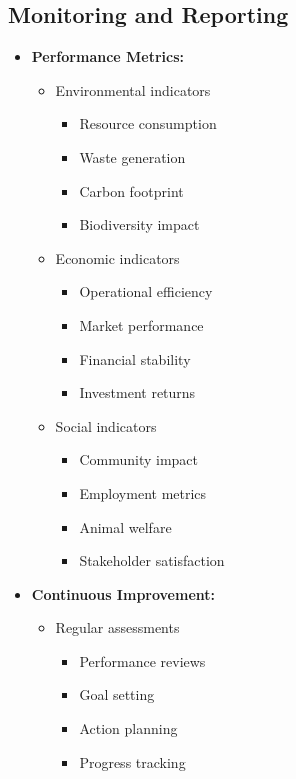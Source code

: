 \subsection{Monitoring and Reporting}
\begin{itemize}
    \item \textbf{Performance Metrics:}
    \begin{itemize}
        \item Environmental indicators
        \begin{itemize}
            \item Resource consumption
            \item Waste generation
            \item Carbon footprint
            \item Biodiversity impact
        \end{itemize}
        
        \item Economic indicators
        \begin{itemize}
            \item Operational efficiency
            \item Market performance
            \item Financial stability
            \item Investment returns
        \end{itemize}
        
        \item Social indicators
        \begin{itemize}
            \item Community impact
            \item Employment metrics
            \item Animal welfare
            \item Stakeholder satisfaction
        \end{itemize}
    \end{itemize}
    
    \item \textbf{Continuous Improvement:}
    \begin{itemize}
        \item Regular assessments
        \begin{itemize}
            \item Performance reviews
            \item Goal setting
            \item Action planning
            \item Progress tracking
        \end{itemize}
        

\end{itemize}
\end{itemize}
